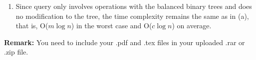 \documentclass[12pt,a4paper]{article}
\makeatletter
\newtheorem*{solution}{Solution}
\theoremstyle{definition}
\renewenvironment{solution}[1][Solution] {\par\pushQED{\qed}\normalfont\topsep6\p@\@plus6\p@\relax\trivlist\item[\hskip\labelsep\bfseries#1\@addpunct{.}]\ignorespaces}{\popQED\endtrivlist\@endpefalse} \makeatother
\makeatother
\begin{document}
\begin{enumerate}
\begin{enumerate}
\begin{solution}
\begin{enumerate}
\begin{itemize}
      Since query only involves operations with the balanced binary trees and does no modification to the tree, the time complexity remains the same as in (a), that is, O($m\log n$) in the worst case and O($c\log n$) on average.
    \end{itemize}
  \end{enumerate}
\end{solution}
\end{enumerate} 



    

\end{enumerate}

\vspace{20pt}

\textbf{Remark:} You need to include your .pdf and .tex files in your uploaded .rar or .zip file.

\end{document}
